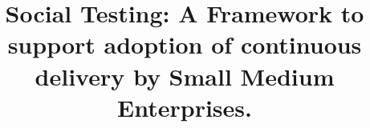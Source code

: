 \documentclass[conference]{IEEEtran}
\begin{document}
%
\title{Social Testing: A Framework to support adoption of continuous delivery by Small Medium Enterprises.}




% 
\end{document}
